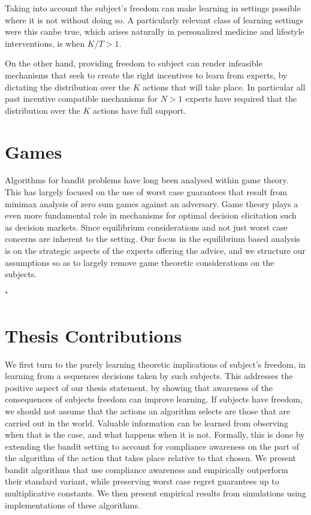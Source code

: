 Taking into account the subject's freedom can make learning in settings possible where it is not without doing so.
A particularly relevant class of learning settings were this canbe true, which arises naturally in personalized medicine and lifestyle interventions, is when $K/T > 1$.

On the other hand, providing freedom to subject can render infeasible mechanisms that seek to create the right incentives to learn from experts, by dictating the distribution over the $K$ actions that will take place.
In particular all past incentive compatible mechanisms for $N>1$ experts have required that the distribution over the $K$ actions have full support.


\section{Games}

Algorithms for bandit problems have long been analysed within game theory.
This has largely focused on the use of worst case guarantees that result from minimax analysis of zero sum games against an adversary.
Game theory plays a even more fundamental role in mechanisms for optimal decision elicitation such as decision markets.
Since equilibrium considerations and not just worst case concerns are inherent to the setting.
Our focus in the equilibrium based analysis is on the strategic aspects of the experts offering the advice, and we structure our assumptions so as to largely remove game theoretic considerations on the subjects.


"%

\section{Thesis Contributions}

We first turn to the purely learning theoretic implications of subject's freedom, in learning from a sequences decisions taken by such subjects.
This addresses the positive aspect of our thesis statement, by showing that awareness of the consequences of subjects freedom can improve learning.
If subjects have freedom, we should not assume that the actions an algorithm selects are those that are carried out in the world.
Valuable information can be learned from observing when that is the case, and what happens when it is not.
Formally, this is done by extending the bandit setting to account for compliance awareness on the part of the algorithm of the action that takes place relative to that chosen.
We present bandit algorithms that use compliance awareness and empirically outperform their standard variant, while preserving worst case regret guarantees up to multiplicative constants.
We then present empirical results from simulations using implementations of these algorithms.


